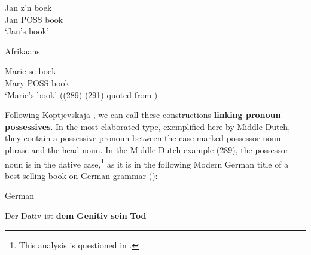 
 \ea\label{}
\gll Jan  z’n  boek\\


Jan  POSS   book\\

\glt ‘Jan’s book’

\z

\item 

\label{bkm:Ref151373831}Afrikaans 



 \ea\label{}
\gll Marie  se  boek\\


Mary  POSS  book\\

\glt ‘Marie’s book’ ((289){}-(291) quoted from \citet[56]{Norde1997})

\z

Following Koptjevskaja-\citet{Tamm2003}, we can call these constructions \textbf{linking pronoun possessives}. In the most elaborated type, exemplified here by Middle Dutch, they contain a possessive pronoun between the case-marked possessor noun phrase and the head noun. In the Middle Dutch example (289), the possessor noun is in the dative case,\footnote{ This analysis is questioned in \citet{Allen2008}.} as it is in the following Modern German title of a best-selling book on German grammar (\citet{Sick2004}):


\item 

\label{bkm:Ref126571195}German



 \ea\label{}
\gll Der  Dativ  ist  \textbf{dem}\textbf{  Genitiv}\textbf{  sein}\textbf{  Tod}\\


